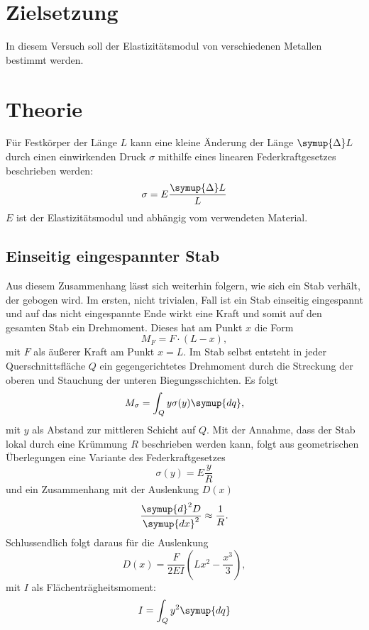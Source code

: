 \section{Zielsetzung}
In diesem Versuch soll der Elastizitätsmodul von verschiedenen Metallen bestimmt werden.
\section{Theorie}
\label{sec:Theorie}
Für Festkörper der Länge $L$ kann eine kleine Änderung der Länge $\symup{\Delta}L$
durch einen einwirkenden Druck $\sigma$
mithilfe eines linearen Federkraftgesetzes beschrieben werden:
\begin{equation}
    \sigma = E\frac{\symup{\Delta}L}{L}
\end{equation}
$E$ ist der Elastizitätsmodul und abhängig vom verwendeten Material.
\subsection{Einseitig eingespannter Stab}
Aus diesem Zusammenhang lässt sich weiterhin folgern, wie sich ein Stab verhält, der gebogen wird.
Im ersten, nicht trivialen, Fall ist ein Stab einseitig eingespannt und auf das nicht eingespannte
Ende wirkt eine Kraft und somit auf den gesamten Stab ein Drehmoment.
Dieses hat am Punkt $x$ die Form
\begin{equation}
    M_F = F\cdot(L-x),
\end{equation}
mit $F$ als äußerer Kraft am Punkt $x=L$.
Im Stab selbst entsteht in jeder Querschnittsfläche $Q$ ein gegengerichtetes Drehmoment durch die
Streckung der oberen und Stauchung der unteren Biegungsschichten.
Es folgt
\begin{equation}
    M_\sigma = \int_Q y \sigma(y) \symup{dq},
\end{equation}
mit $y$ als Abstand zur mittleren Schicht auf $Q$.
Mit der Annahme, dass der Stab lokal durch eine Krümmung $R$ beschrieben werden kann,
folgt aus geometrischen Überlegungen eine Variante des Federkraftgesetzes
\begin{equation}
    \sigma(y) = E\frac{y}{R}
\end{equation}
und ein Zusammenhang mit der Auslenkung $D(x)$
\begin{equation}
    \frac{\symup{d}^2D}{\symup{dx}^2} \approx \frac{1}{R}.
\end{equation}
Schlussendlich folgt daraus für die Auslenkung
\begin{equation}
    D(x) = \frac{F}{2EI}\left(Lx^2-\frac{x^3}{3}\right),
\end{equation}
mit $I$ als Flächenträgheitsmoment:
\begin{equation}
    I = \int_Qy^2\symup{dq}
\end{equation}
